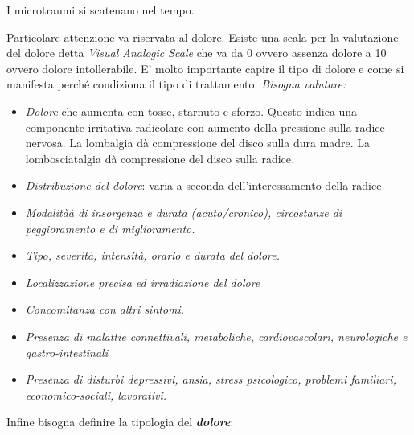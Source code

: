 I microtraumi si scatenano nel tempo.

Particolare attenzione va riservata al dolore. Esiste una scala per la
valutazione del dolore detta \emph{\emph{Visual Analogic Scale}} che va
da 0 ovvero assenza dolore a 10 ovvero dolore intollerabile. E' molto
importante capire il tipo di dolore e come si manifesta perché
condiziona il tipo di trattamento. \emph{Bisogna valutare:}

\begin{itemize}
\item
  \emph{\emph{Dolore}} che aumenta con tosse, starnuto e sforzo. Questo
  indica una componente irritativa radicolare con aumento della
  pressione sulla radice nervosa. La lombalgia dà compressione del disco
  sulla dura madre. La lombosciatalgia dà compressione del disco sulla
  radice\emph{. }
\item
  \emph{\emph{Distribuzione del dolore}}: varia a seconda
  dell'interessamento della radice.
\item
  \emph{Modalitàà di insorgenza e durata (acuto/cronico), circostanze di
  peggioramento e di miglioramento. }

\item
  \emph{Tipo, severità, intensità, orario e durata del dolore. }
\item
  \emph{Localizzazione precisa ed irradiazione del dolore}
\item
  \emph{Concomitanza con altri sintomi. }
\item
  \emph{Presenza di malattie connettivali, metaboliche, cardiovascolari,
  neurologiche e gastro-intestinali}
\item
  \emph{Presenza di disturbi depressivi, ansia, stress psicologico,
  problemi familiari, economico-sociali, lavorativi.}
\end{itemize}

Infine bisogna definire la tipologia del \textbf{\emph{dolore}}:

